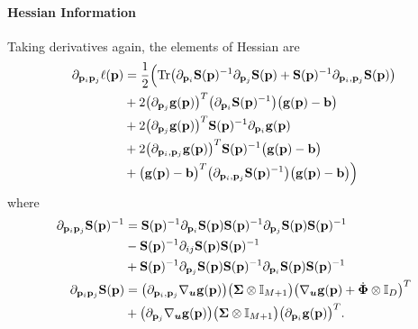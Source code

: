 \paragraph{Hessian Information}
Taking derivatives again, the elements of Hessian are
\begin{equation}
	\begin{aligned} \label{eq:wnll-hess}
		\partial_{\mathbf{p}_i \mathbf{p}_j} \ell(\mathbf{p}) &= \frac{1}{2}\Bigl( \operatorname{Tr}\bigl(\partial_{\mathbf{p}_i}\mathbf{S}(\mathbf{p})^{-1} \partial_{\mathbf{p}_j}\mathbf{S}(\mathbf{p}) + \mathbf{S}(\mathbf{p})^{-1} \partial_{\mathbf{p}_i,\mathbf{p}_j}\mathbf{S}(\mathbf{p})\bigr) \\
		&+ 2\bigl(\partial_{\mathbf{p}_j} \mathbf{g}(\mathbf{p})\bigr)^T \bigl(\partial_{\mathbf{p}_i} \mathbf{S}(\mathbf{p})^{-1}\bigr) \bigl(\mathbf{g}(\mathbf{p}) - \mathbf{b}\bigr) \\
		&+ 2\bigl(\partial_{\mathbf{p}_j} \mathbf{g}(\mathbf{p})\bigr)^T \mathbf{S}(\mathbf{p})^{-1} \partial_{\mathbf{p}_i} \mathbf{g}(\mathbf{p}) \\
		&+ 2\bigl(\partial_{\mathbf{p}_i,\mathbf{p}_j} \mathbf{g}(\mathbf{p})\bigr)^T \mathbf{S}(\mathbf{p})^{-1} \bigl(\mathbf{g}(\mathbf{p}) - \mathbf{b}\bigr)\\
		&+ \bigl(\mathbf{g}(\mathbf{p}) - \mathbf{b}\bigr)^T\bigl(\partial_{\mathbf{p}_i,\mathbf{p}_j} \mathbf{S}(\mathbf{p})^{-1}\bigr)\bigl(\mathbf{g}(\mathbf{p}) - \mathbf{b}\bigr)\Bigr)
	\end{aligned}
\end{equation}
where
\begin{align*}
	\partial_{\mathbf{p}_i \mathbf{p}_j} \mathbf{S}(\mathbf{p})^{-1} &= \mathbf{S}(\mathbf{p})^{-1} \partial_{\mathbf{p}_i} \mathbf{S}(\mathbf{p}) \mathbf{S}(\mathbf{p})^{-1} \partial_{\mathbf{p}_j} \mathbf{S}(\mathbf{p}) \mathbf{S}(\mathbf{p})^{-1} \\
	&- \mathbf{S}(\mathbf{p})^{-1} \partial_{ij} \mathbf{S}(\mathbf{p}) \mathbf{S}(\mathbf{p})^{-1} \\
	&+ \mathbf{S}(\mathbf{p})^{-1} \partial_{\mathbf{p}_j} \mathbf{S}(\mathbf{p}) \mathbf{S}(\mathbf{p})^{-1}  \partial_{\mathbf{p}_i} \mathbf{S}(\mathbf{p}) \mathbf{S}(\mathbf{p})^{-1}\\
	\partial_{\mathbf{p}_i \mathbf{p}_j} \mathbf{S}(\mathbf{p})&= \bigl(\partial_{\mathbf{p}_i,\mathbf{p}_j} \nabla_{\boldsymbol{u}} \mathbf{g}(\mathbf{p})\bigr) \bigl( \mathbf{\Sigma} \otimes \mathbb{I}_{M+1}\bigr) \bigl(\nabla_{\boldsymbol{u}} \mathbf{g}(\mathbf{p}) + \dot{\boldsymbol{\Phi}} \otimes \mathbb{I}_D\bigr)^T \\
	&+ \bigl(\partial_{\mathbf{p}_j} \nabla_{\boldsymbol{u}} \mathbf{g}(\mathbf{p})\bigr) \bigl( \mathbf{\Sigma} \otimes \mathbb{I}_{M+1}\bigr) \bigl(\partial_{\mathbf{p}_i} \mathbf{g}(\mathbf{p})\bigr)^T.
\end{align*}

